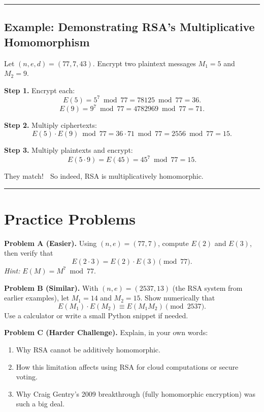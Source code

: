 \documentclass[12pt]{article}
\begin{document}
\bigskip
\hrule
\vspace{0.5em}

\subsection*{Example: Demonstrating RSA’s Multiplicative Homomorphism}

Let $(n,e,d) = (77,7,43)$.  
Encrypt two plaintext messages $M_1 = 5$ and $M_2 = 9$.

\textbf{Step 1.} Encrypt each:
\[
E(5) = 5^7 \bmod 77 = 78125 \bmod 77 = 36.
\]
\[
E(9) = 9^7 \bmod 77 = 4782969 \bmod 77 = 71.
\]

\textbf{Step 2.} Multiply ciphertexts:
\[
E(5)\cdot E(9) \bmod 77 = 36\cdot71 \bmod 77 = 2556 \bmod 77 = 15.
\]

\textbf{Step 3.} Multiply plaintexts and encrypt:
\[
E(5\cdot9) = E(45) = 45^7 \bmod 77 = 15.
\]

They match! 🎉  
So indeed, RSA is multiplicatively homomorphic.

\bigskip
\hrule
\vspace{0.5em}

\section*{Practice Problems}

\textbf{Problem A (Easier).}  
Using $(n,e) = (77,7)$, compute $E(2)$ and $E(3)$, then verify that  
\[
E(2\cdot3) = E(2)\cdot E(3) \pmod{77}.
\]
\emph{Hint:} $E(M) = M^7\bmod77$.  
\vspace{2cm}

\textbf{Problem B (Similar).}  
With $(n,e)=(2537,13)$ (the RSA system from earlier examples),  
let $M_1 = 14$ and $M_2 = 15$.  
Show numerically that  
\[
E(M_1)\cdot E(M_2) \equiv E(M_1M_2) \pmod{2537}.
\]
Use a calculator or write a small Python snippet if needed.  
\vspace{3cm}

\textbf{Problem C (Harder Challenge).}  
Explain, in your own words:
\begin{enumerate}
  \item Why RSA cannot be additively homomorphic.
  \item How this limitation affects using RSA for cloud computations or secure voting.
  \item Why Craig Gentry’s 2009 breakthrough (fully homomorphic encryption) was such a big deal.
\end{enumerate}
\vspace{4cm}
\end{document}
